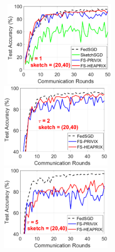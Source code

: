 \documentclass[twoside]{article}
\begin{document}
\begin{figure}[H]
\begin{center}
		\mbox{\hspace{-0.15in}	
		\includegraphics[width=2.2in]{MNIST_figures/local1_sketch20_iid0_test_acc.eps} \hspace{-0.15in}
		\includegraphics[width=2.2in]{MNIST_figures/local2_sketch20_iid0_test_acc.eps} \hspace{-0.15in}
		\includegraphics[width=2.2in]{MNIST_figures/local5_sketch20_iid0_test_acc.eps}
		}
		

\end{center}
\end{figure}
\end{document}
